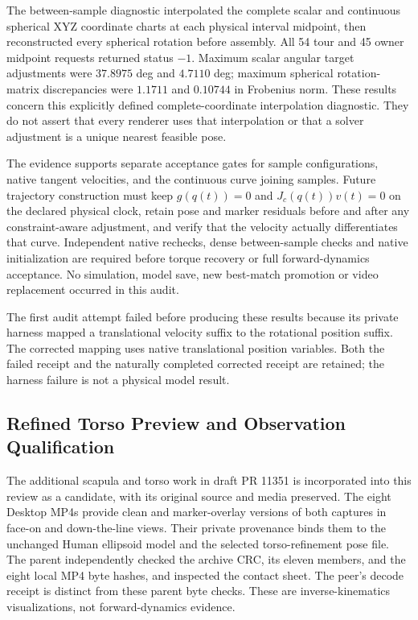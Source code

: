 \documentclass[11pt,a4paper]{article}
\begin{document}
The between-sample diagnostic interpolated the complete scalar and
continuous spherical XYZ coordinate charts at each physical interval
midpoint, then reconstructed every spherical rotation before assembly.
All 54 tour and 45 owner midpoint requests returned status $-1$. Maximum
scalar angular target adjustments were $37.8975$ deg and $4.7110$ deg;
maximum spherical rotation-matrix discrepancies were $1.1711$ and
$0.10744$ in Frobenius norm. These results concern this explicitly defined
complete-coordinate interpolation diagnostic. They do not assert that
every renderer uses that interpolation or that a solver adjustment is a
unique nearest feasible pose.

The evidence supports separate acceptance gates for sample configurations,
native tangent velocities, and the continuous curve joining samples.
Future trajectory construction must keep $g(q(t))=0$ and
$J_c(q(t))v(t)=0$ on the declared physical clock, retain pose and marker
residuals before and after any constraint-aware adjustment, and verify that
the velocity actually differentiates that curve. Independent native
rechecks, dense between-sample checks and native initialization are
required before torque recovery or full forward-dynamics acceptance.
No simulation, model save, new best-match promotion or video replacement
occurred in this audit.

The first audit attempt failed before producing these results because its
private harness mapped a translational velocity suffix to the rotational
position suffix. The corrected mapping uses native translational position
variables. Both the failed receipt and the naturally completed corrected
receipt are retained; the harness failure is not a physical model result.


\subsection{Refined Torso Preview and Observation Qualification}
\label{sec:refined-torso-preview-review}
The additional scapula and torso work in draft PR 11351 is incorporated
into this review as a candidate, with its original source and media preserved.
The eight Desktop MP4s provide clean and marker-overlay versions of both
captures in face-on and down-the-line views. Their private provenance binds
them to the unchanged Human ellipsoid model and the selected torso-refinement
pose file. The parent independently checked the archive CRC, its eleven
members, and the eight local MP4 byte hashes, and inspected the contact sheet.
The peer's decode receipt is distinct from these parent byte checks.
These are inverse-kinematics visualizations, not forward-dynamics evidence.
\end{document}

